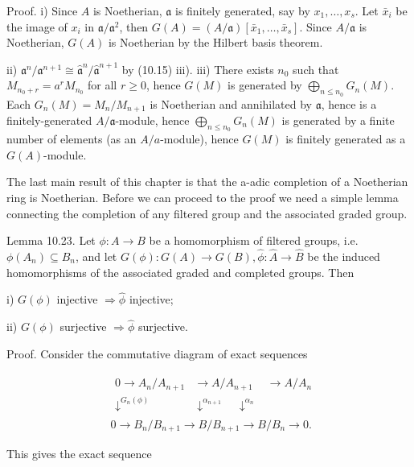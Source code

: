 \documentclass{standalone}
\theoremstyle{definition}
\theoremstyle{remark}
\begin{document}
Proof. i) Since $A$ is Noetherian, $\mathfrak{a}$ is finitely generated, say by $x_{1}, \ldots, x_{s}$. Let $\bar{x}_{i}$ be the image of $x_{i}$ in $\mathfrak{a} / \mathfrak{a}^{2}$, then $G(A)=(A / \mathfrak{a})\left[\bar{x}_{1}, \ldots, \bar{x}_{s}\right]$. Since $A / \mathfrak{a}$ is Noetherian, $G(A)$ is Noetherian by the Hilbert basis theorem.

ii) $\mathfrak{a}^{n} / \mathfrak{a}^{n+1} \cong \hat{\mathfrak{a}}^{n} / \hat{\mathfrak{a}}^{n+1}$ by (10.15) iii). iii) There exists $n_{0}$ such that $M_{n_{0}+r}=a^{r} M_{n_{0}}$ for all $r \geqslant 0$, hence $G(M)$ is generated by $\bigoplus_{n \leqslant n_{0}} G_{n}(M)$. Each $G_{n}(M)=M_{n} / M_{n+1}$ is Noetherian and annihilated by $\mathfrak{a}$, hence is a finitely-generated $A / \mathfrak{a}$-module, hence $\bigoplus_{n \leqslant n_{0}} G_{n}(M)$ is generated by a finite number of elements (as an $A / a$-module), hence $G(M)$ is finitely generated as a $G(A)$-module.

The last main result of this chapter is that the a-adic completion of a Noetherian ring is Noetherian. Before we can proceed to the proof we need a simple lemma connecting the completion of any filtered group and the associated graded group.

Lemma 10.23. Let $\phi: A \rightarrow B$ be a homomorphism of filtered groups, i.e. $\phi\left(A_{n}\right) \subseteq B_{n}$, and let $G(\phi): G(A) \rightarrow G(B), \hat{\phi}: \hat{A} \rightarrow \hat{B}$ be the induced homomorphisms of the associated graded and completed groups. Then

i) $G(\phi)$ injective $\Rightarrow \hat{\phi}$ injective;

ii) $G(\phi)$ surjective $\Rightarrow \hat{\phi}$ surjective.

Proof. Consider the commutative diagram of exact sequences

\[
\begin{aligned}
& \begin{array}{ccc}
0 \rightarrow A_{n} / A_{n+1} & \rightarrow A / A_{n+1} & \rightarrow A / A_{n} \\
\downarrow^{G_{n}(\phi)} & \downarrow^{\alpha_{n+1}} \quad \downarrow^{\alpha_{n}} &
\end{array} \\
& 0 \rightarrow B_{n} / B_{n+1} \rightarrow B / B_{n+1} \rightarrow B / B_{n} \rightarrow 0 .
\end{aligned}
\]

This gives the exact sequence
\end{document}

